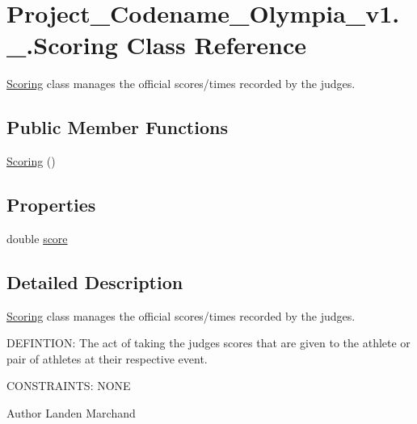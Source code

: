\hypertarget{classProject__Codename__Olympia__v1_1_1__0_1_1Scoring}{}\section{Project\+\_\+\+Codename\+\_\+\+Olympia\+\_\+v1.\+\_.\+Scoring Class Reference}
\label{classProject__Codename__Olympia__v1_1_1__0_1_1Scoring}


\hyperlink{classProject__Codename__Olympia__v1_1_1__0_1_1Scoring}{Scoring} class manages the official scores/times recorded by the judges.  


\subsection*{Public Member Functions}
\begin{DoxyCompactItemize}
\item 
\hyperlink{classProject__Codename__Olympia__v1_1_1__0_1_1Scoring_a78bad296e0e310facc8014cf54593e1f}{Scoring} ()
\end{DoxyCompactItemize}
\subsection*{Properties}
\begin{DoxyCompactItemize}
\item 
double \hyperlink{classProject__Codename__Olympia__v1_1_1__0_1_1Scoring_adc409739cbf8bbf3eab56b7569bf90ac}{score}
\end{DoxyCompactItemize}


\subsection{Detailed Description}
\hyperlink{classProject__Codename__Olympia__v1_1_1__0_1_1Scoring}{Scoring} class manages the official scores/times recorded by the judges. 

D\+E\+F\+I\+N\+T\+I\+ON\+: The act of taking the judges scores that are given to the athlete or pair of athletes at their respective event.

C\+O\+N\+S\+T\+R\+A\+I\+N\+TS\+: N\+O\+NE\begin{DoxyAuthor}{Author}
Landen Marchand 
\end{DoxyAuthor}



